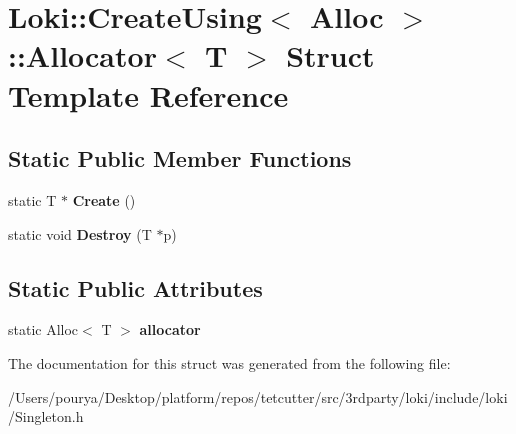 \hypertarget{structLoki_1_1CreateUsing_1_1Allocator}{}\section{Loki\+:\+:Create\+Using$<$ Alloc $>$\+:\+:Allocator$<$ T $>$ Struct Template Reference}
\label{structLoki_1_1CreateUsing_1_1Allocator}
\subsection*{Static Public Member Functions}
\begin{DoxyCompactItemize}
\item 
\hypertarget{structLoki_1_1CreateUsing_1_1Allocator_a611bf5b695c98957dace10a27ab118dd}{}static T $\ast$ {\bfseries Create} ()\label{structLoki_1_1CreateUsing_1_1Allocator_a611bf5b695c98957dace10a27ab118dd}

\item 
\hypertarget{structLoki_1_1CreateUsing_1_1Allocator_a0fd04c1d84a169f9dd17117453a8e7f3}{}static void {\bfseries Destroy} (T $\ast$p)\label{structLoki_1_1CreateUsing_1_1Allocator_a0fd04c1d84a169f9dd17117453a8e7f3}

\end{DoxyCompactItemize}
\subsection*{Static Public Attributes}
\begin{DoxyCompactItemize}
\item 
\hypertarget{structLoki_1_1CreateUsing_1_1Allocator_a8ed340e365bb91a61f1a24dc08133085}{}static Alloc$<$ T $>$ {\bfseries allocator}\label{structLoki_1_1CreateUsing_1_1Allocator_a8ed340e365bb91a61f1a24dc08133085}

\end{DoxyCompactItemize}


The documentation for this struct was generated from the following file\+:\begin{DoxyCompactItemize}
\item 
/\+Users/pourya/\+Desktop/platform/repos/tetcutter/src/3rdparty/loki/include/loki/Singleton.\+h\end{DoxyCompactItemize}
